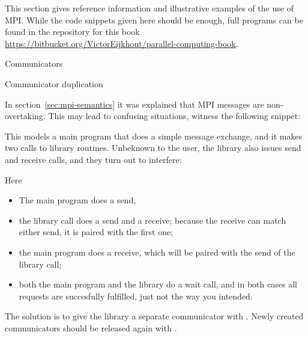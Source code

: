 
This section gives reference information and illustrative examples
of the use of MPI. While the code snippets given here should be enough,
full programs can be found in the repository for this book
\url{https://bitbucket.org/VictorEijkhout/parallel-computing-book}.

 {Communicators}

 {Communicator duplication}

In section~\ref{sec:mpi-semantics} it was explained that MPI messages are 
non-overtaking. This may lead to confusing situations, witness the following snippet:


This models a main program that does a simple message exchange, and it
makes two calls to library routines. Unbeknown to the user, the
library also issues send and receive calls, and they turn out to
interfere:


Here
\begin{itemize}
\item The main program does a send,
\item the library call  does a send and a receive;
  because the receive can match either send, it is paired with the
  first one;
\item the main program does a receive, which will be paired with the send of the 
  library call;
\item both the main program and the library do a wait call, and in
  both cases all requests are succesfully fulfilled, just not the way
  you intended.
\end{itemize}

The solution is to give the library a separate communicator with
.
%
%
Newly created communicators should be
released again with .



